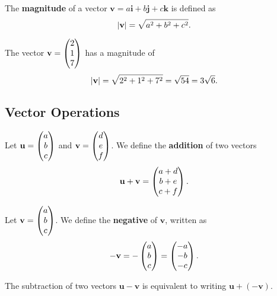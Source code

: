 \documentclass[12pt]{article}
\renewcommand{\vec}{\mathbf}
\begin{document}
\begin{defn}[Magnitude]
	The \textbf{magnitude} of a vector \(\vec{v} = a\vec{i} + b\vec{j} + c\vec{k}\) is defined as
	\[ \abs{\vec{v}} = \sqrt{a^2 + b^2 + c^2}. \] 
\end{defn}

\begin{eg}
	\label{eg:magnitude}
	The vector \(\vec{v} = \cvec{2 \\ 1 \\ 7}\) has a magnitude of 
	\[ \abs{\vec{v}} = \sqrt{2^2 + 1^2 + 7^2} = \sqrt{54} = 3 \sqrt{6}. \] 
\end{eg}

\subsection{Vector Operations}

\begin{defn}
	Let \(\vec{u} = \cvec{a \\ b \\ c}\) and \(\vec{v} = \cvec{d \\ e \\ f}\). 
	We define the \textbf{addition} of two vectors 
	\[\vec{u} + \vec{v} = \cvec{a + d \\ b + e \\ c + f}.\]
\end{defn}

\begin{defn} \label{defn:negv}
	Let \(\vec{v} = \cvec{a \\ b \\ c}\). 
	We define the \textbf{negative} of \(\vec{v}\), written as
	\[-\vec{v} = -\cvec{a \\ b \\ c} = \cvec{-a \\ -b \\ -c}.\]
\end{defn}

\begin{rmk}
	The subtraction of two vectors \(\vec{u} - \vec{v}\) is equivalent to writing \(\vec{u} + (-\vec{v})\). 
\end{rmk}
\end{document}
